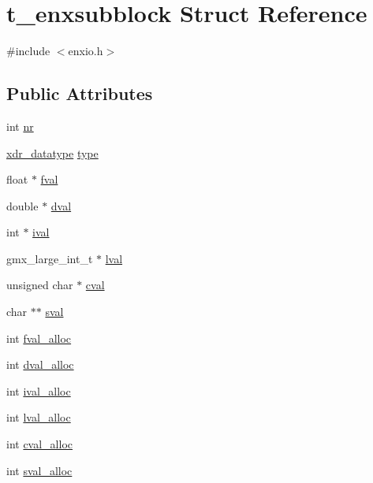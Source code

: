 \hypertarget{structt__enxsubblock}{\section{t\-\_\-enxsubblock \-Struct \-Reference}
\label{structt__enxsubblock}
}


{\ttfamily \#include $<$enxio.\-h$>$}

\subsection*{\-Public \-Attributes}
\begin{DoxyCompactItemize}
\item 
int \hyperlink{structt__enxsubblock_a891afb91f9bc8cbbfe50f75d526ae823}{nr}
\item 
\hyperlink{include_2xdrf_8h_a754236259282db9c05044367520558a8}{xdr\-\_\-datatype} \hyperlink{structt__enxsubblock_a9cedf8d9f106f37d632285883e8dba7e}{type}
\item 
float $\ast$ \hyperlink{structt__enxsubblock_aefb348e22ff40a97367007f478b86873}{fval}
\item 
double $\ast$ \hyperlink{structt__enxsubblock_a361d049e17c6f640cb0ec5b0e65756ee}{dval}
\item 
int $\ast$ \hyperlink{structt__enxsubblock_a513d1a52dea324e092188f5f37befdf5}{ival}
\item 
gmx\-\_\-large\-\_\-int\-\_\-t $\ast$ \hyperlink{structt__enxsubblock_a4269df43dbe8715580c53caa0d0e1885}{lval}
\item 
unsigned char $\ast$ \hyperlink{structt__enxsubblock_af84da87395c021c30d38c3295e643c3e}{cval}
\item 
char $\ast$$\ast$ \hyperlink{structt__enxsubblock_a4542514937b3aa9b7174618b4ae08f11}{sval}
\item 
int \hyperlink{structt__enxsubblock_aa32620fc0b9f5fe8cb2b8dcbb11682f8}{fval\-\_\-alloc}
\item 
int \hyperlink{structt__enxsubblock_a209ba54f6bda312d5f846cfe1d628865}{dval\-\_\-alloc}
\item 
int \hyperlink{structt__enxsubblock_a3d62d9f696be98002367cc7b48e8c91e}{ival\-\_\-alloc}
\item 
int \hyperlink{structt__enxsubblock_a0e271cbd4531d2552ab4b942b736a46b}{lval\-\_\-alloc}
\item 
int \hyperlink{structt__enxsubblock_a6d537b04e9d28aecc0728ced432a8f6f}{cval\-\_\-alloc}
\item 
int \hyperlink{structt__enxsubblock_ae10ae467cda055b482675c2e7dbe0f45}{sval\-\_\-alloc}
\end{DoxyCompactItemize}



